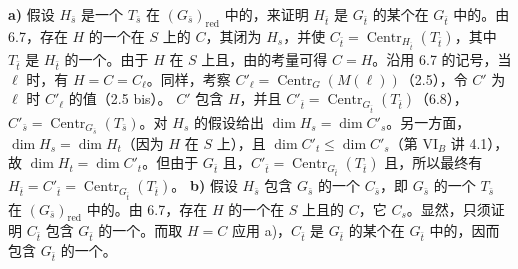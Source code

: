 \textbf{a)} 假设 $H_{\bar s}$ 是一个 $T_{\bar s}$ 在 $(G_{\bar s})_{\mathrm{red}}$ 中的，来证明 $H_{\bar t}$ 是 $G_{\bar t}$ 的某个在 $G_{\bar t}$ 中的。由 6.7，存在 $H$ 的一个在 $S$ 上的 $C$，其闭为 $H_s$，并使 $C_{\bar t}=\operatorname{Centr}_{H_{\bar t}}(T_{\bar t})$，其中 $T_{\bar t}$ 是 $H_{\bar t}$ 的一个。由于 $H$ 在 $S$ 上且，由的考量可得 $C=H$。沿用 6.7 的记号，当 $\ell$ 时，有 $H=C=C_{\ell}$。同样，考察 $C'_{\ell}=\operatorname{Centr}_G(M(\ell))$（2.5），令 $C'$ 为 $\ell$ 时 $C'_{\ell}$ 的值（2.5 bis）。 $C'$ 包含 $H$，并且 $C'_{\bar t}=\operatorname{Centr}_{G_{\bar t}}(T_{\bar t})$（6.8），$C'_{\bar s}=\operatorname{Centr}_{G_{\bar s}}(T_{\bar s})$。对 $H_s$ 的假设给出 $\dim H_s=\dim C'_s$。另一方面，$\dim H_s=\dim H_t$（因为 $H$ 在 $S$ 上），且 $\dim C'_t\leq\dim C'_s$（第 VI$_B$ 讲 4.1），故 $\dim H_t=\dim C'_t$。但由于 $G_{\bar t}$ 且，$C'_{\bar t}=\operatorname{Centr}_{G_{\bar t}}(T_{\bar t})$ 且，所以最终有 $H_{\bar t}=C'_{\bar t}=\operatorname{Centr}_{G_{\bar t}}(T_{\bar t})$。
\textbf{b)} 假设 $H_{\bar s}$ 包含 $G_{\bar s}$ 的一个 $C_{\bar s}$，即 $G_{\bar s}$ 的一个 $T_{\bar s}$ 在 $(G_{\bar s})_{\mathrm{red}}$ 中的。由 6.7，存在 $H$ 的一个在 $S$ 上且的 $C$，它 $C_s$。显然，只须证明 $C_{\bar t}$ 包含 $G_{\bar t}$ 的一个。而取 $H=C$ 应用 a)，$C_{\bar t}$ 是 $G_{\bar t}$ 的某个在 $G_{\bar t}$ 中的，因而包含 $G_{\bar t}$ 的一个。

